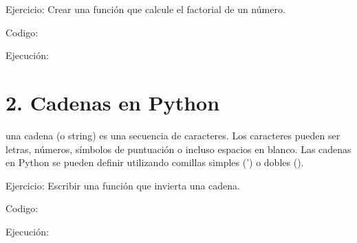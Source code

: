 \documentclass[a4paper]{article}
\begin{document}
\bigskip

{
Ejercicio: Crear una función que calcule el factorial de un número.}



\begin{center}
\end{center}
{
Codigo:}

{
Ejecución:}

\begin{center}
\end{center}

\bigskip

\section{2. Cadenas en Python}

\bigskip

{
una cadena (o string) es una secuencia de caracteres. Los caracteres pueden ser letras, números, símbolos de puntuación
o incluso espacios en blanco. Las cadenas en Python se pueden definir utilizando comillas simples (') o dobles
({\textquotedbl}).}

\pagestyle{Convertedi}
{
Ejercicio: Escribir una función que invierta una cadena.}

\begin{center}
\end{center}

\bigskip

{
Codigo:}

{
Ejecución:}

\begin{center}
\end{center}

\clearpage
\end{document}
